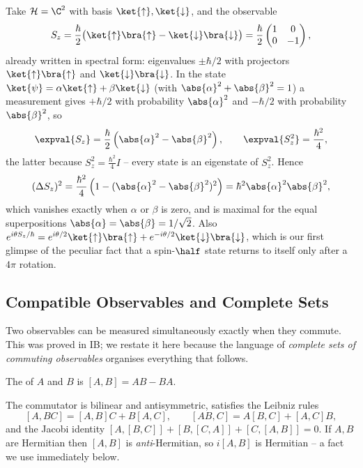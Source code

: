 \begin{example}
    Take $\mathcal{H} = \C^2$ with basis $\ket{\uparrow}, \ket{\downarrow}$, and the observable
    $$
    S_z = \frac{\hbar}{2}\big( \ket{\uparrow}\bra{\uparrow} - \ket{\downarrow}\bra{\downarrow}\big) = \frac{\hbar}{2}\begin{pmatrix} 1 & 0 \\ 0 & -1 \end{pmatrix},
    $$
    already written in spectral form: eigenvalues $\pm\hbar/2$ with projectors $\ket{\uparrow}\bra{\uparrow}$ and $\ket{\downarrow}\bra{\downarrow}$. In the state $\ket{\psi} = \alpha\ket{\uparrow} + \beta\ket{\downarrow}$ (with $\abs{\alpha}^2 + \abs{\beta}^2 = 1$) a measurement gives $+\hbar/2$ with probability $\abs{\alpha}^2$ and $-\hbar/2$ with probability $\abs{\beta}^2$, so
    $$
    \expval{S_z} = \frac{\hbar}{2}\left( \abs{\alpha}^2 - \abs{\beta}^2 \right), \qquad \expval{S_z^2} = \frac{\hbar^2}{4},
    $$
    the latter because $S_z^2 = \frac{\hbar^2}{4}I$ -- every state is an eigenstate of $S_z^2$. Hence
    $$
    (\Delta S_z)^2 = \frac{\hbar^2}{4}\left(1 - (\abs{\alpha}^2 - \abs{\beta}^2)^2\right) = \hbar^2 \abs{\alpha}^2\abs{\beta}^2,
    $$
    which vanishes exactly when $\alpha$ or $\beta$ is zero, and is maximal for the equal superpositions $\abs{\alpha} = \abs{\beta} = 1/\sqrt2$. Also $e^{i\theta S_z/\hbar} = e^{i\theta/2}\ket{\uparrow}\bra{\uparrow} + e^{-i\theta/2}\ket{\downarrow}\bra{\downarrow}$, which is our first glimpse of the peculiar fact that a spin-$\half$ state returns to itself only after a $4\pi$ rotation.
\end{example}

\subsection{Compatible Observables and Complete Sets}

Two observables can be measured simultaneously exactly when they commute. This was proved in IB; we restate it here because the language of \emph{complete sets of commuting observables} organises everything that follows.

\begin{definition}[Commutator]
    The  of $A$ and $B$ is $[A,B] = AB - BA$.
\end{definition}

The commutator is bilinear and antisymmetric, satisfies the Leibniz rules
$$
[A, BC] = [A,B]C + B[A,C], \qquad [AB, C] = A[B,C] + [A,C]B,
$$
and the Jacobi identity $[A,[B,C]] + [B,[C,A]] + [C,[A,B]] = 0$. If $A, B$ are Hermitian then $[A,B]$ is \emph{anti}-Hermitian, so $i[A,B]$ is Hermitian -- a fact we use immediately below.


